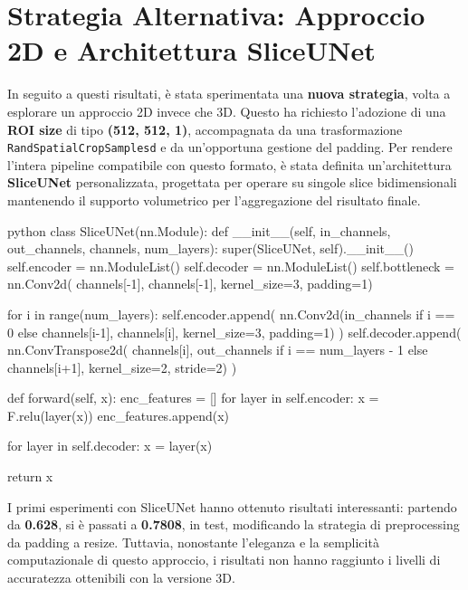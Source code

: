 \section{Strategia Alternativa: Approccio 2D e Architettura SliceUNet}

In seguito a questi risultati, è stata sperimentata una \textbf{nuova strategia}, volta a esplorare un approccio 2D invece che 3D. Questo ha richiesto l’adozione di una \textbf{ROI size} di tipo \textbf{(512, 512, 1)}, accompagnata da una trasformazione \texttt{RandSpatialCropSamplesd} e da un’opportuna gestione del padding. Per rendere l’intera pipeline compatibile con questo formato, è stata definita un’architettura \textbf{SliceUNet} personalizzata, progettata per operare su singole slice bidimensionali mantenendo il supporto volumetrico per l’aggregazione del risultato finale.

\begin{code}{python}
class SliceUNet(nn.Module):
    def __init__(self, in_channels, out_channels, channels, num_layers):
        super(SliceUNet, self).__init__()
        self.encoder = nn.ModuleList()
        self.decoder = nn.ModuleList()
        self.bottleneck = nn.Conv2d(
            channels[-1], 
            channels[-1], 
            kernel_size=3, 
            padding=1)
        
        for i in range(num_layers):
            self.encoder.append(
                nn.Conv2d(in_channels if i == 0 else channels[i-1], 
                channels[i], 
                kernel_size=3, 
                padding=1)
            )
            self.decoder.append(
                nn.ConvTranspose2d(
                    channels[i], 
                    out_channels if i == num_layers - 1 else channels[i+1], 
                    kernel_size=2, 
                    stride=2)
            )
    
    def forward(self, x):
        enc_features = []
        for layer in self.encoder:
            x = F.relu(layer(x))
            enc_features.append(x)
        
        for layer in self.decoder:
            x = layer(x)
        
        return x
\end{code}



I primi esperimenti con SliceUNet hanno ottenuto risultati interessanti: partendo da \textbf{0.628}, si è passati a \textbf{0.7808}, in test, modificando la strategia di preprocessing da padding a resize. Tuttavia, nonostante l’eleganza e la semplicità computazionale di questo approccio, i risultati non hanno raggiunto i livelli di accuratezza ottenibili con la versione 3D.

